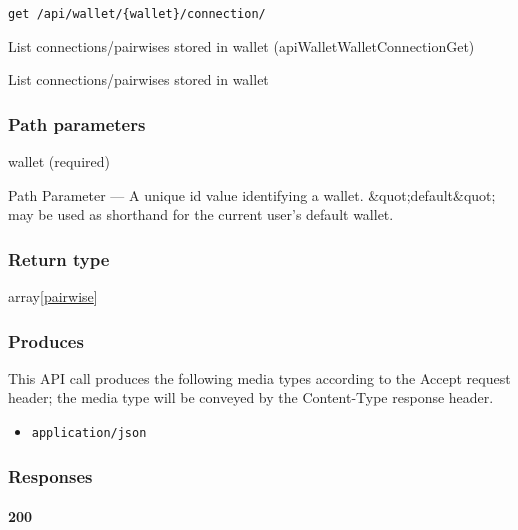 \protect\hypertarget{apiWalletWalletConnectionGet}{}{}

\begin{verbatim}
get /api/wallet/{wallet}/connection/
\end{verbatim}

List connections/pairwises stored in wallet
({apiWalletWalletConnectionGet})

List connections/pairwises stored in wallet

\hypertarget{path-parameters-104}{%
\subsubsection{Path parameters}\label{path-parameters-104}}

wallet (required)

{Path Parameter} --- A unique id value identifying a wallet.
\&quot;default\&quot; may be used as shorthand for the current user's
default wallet.

\hypertarget{return-type-146}{%
\subsubsection{Return type}\label{return-type-146}}

array{[}\protect\hyperlink{pairwise}{pairwise}{]}

\hypertarget{produces-185}{%
\subsubsection{Produces}\label{produces-185}}

This API call produces the following media types according to the
{Accept} request header; the media type will be conveyed by the
{Content-Type} response header.

\begin{itemize}
\tightlist
\item
  \texttt{application/json}
\end{itemize}

\hypertarget{responses-191}{%
\subsubsection{Responses}\label{responses-191}}

\hypertarget{section-616}{%
\paragraph{200}\label{section-616}}


